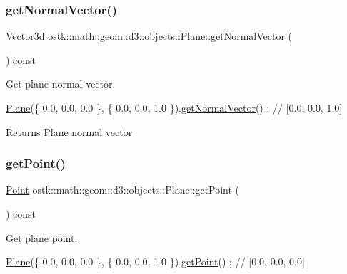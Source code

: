 \subsubsection{\texorpdfstring{get\+Normal\+Vector()}{getNormalVector()}}
{\footnotesize\ttfamily Vector3d ostk\+::math\+::geom\+::d3\+::objects\+::\+Plane\+::get\+Normal\+Vector (\begin{DoxyParamCaption}{ }\end{DoxyParamCaption}) const}



Get plane normal vector. 


\begin{DoxyCode}
\hyperlink{classostk_1_1math_1_1geom_1_1d3_1_1objects_1_1_plane_ac66c2a3b3d9d7cd1fd507123091bb38f}{Plane}(\{ 0.0, 0.0, 0.0 \}, \{ 0.0, 0.0, 1.0 \}).\hyperlink{classostk_1_1math_1_1geom_1_1d3_1_1objects_1_1_plane_adad78a414d67a13cd87c9f5c569990ea}{getNormalVector}() ; \textcolor{comment}{// [0.0, 0.0, 1.0]}
\end{DoxyCode}


\begin{DoxyReturn}{Returns}
\hyperlink{classostk_1_1math_1_1geom_1_1d3_1_1objects_1_1_plane}{Plane} normal vector 
\end{DoxyReturn}
\mbox{\label{classostk_1_1math_1_1geom_1_1d3_1_1objects_1_1_plane_a9e8b046781fec60f76faac94869908ec}} 
\subsubsection{\texorpdfstring{get\+Point()}{getPoint()}}
{\footnotesize\ttfamily \hyperlink{classostk_1_1math_1_1geom_1_1d3_1_1objects_1_1_point}{Point} ostk\+::math\+::geom\+::d3\+::objects\+::\+Plane\+::get\+Point (\begin{DoxyParamCaption}{ }\end{DoxyParamCaption}) const}



Get plane point. 


\begin{DoxyCode}
\hyperlink{classostk_1_1math_1_1geom_1_1d3_1_1objects_1_1_plane_ac66c2a3b3d9d7cd1fd507123091bb38f}{Plane}(\{ 0.0, 0.0, 0.0 \}, \{ 0.0, 0.0, 1.0 \}).\hyperlink{classostk_1_1math_1_1geom_1_1d3_1_1objects_1_1_plane_a9e8b046781fec60f76faac94869908ec}{getPoint}() ; \textcolor{comment}{// [0.0, 0.0, 0.0]}
\end{DoxyCode}


